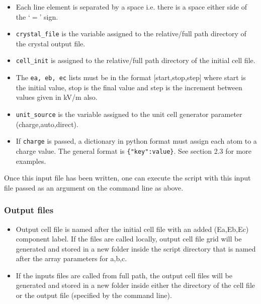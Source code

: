\begin{itemize}
	\item Each line element is separated by a space i.e. there is a space either side of the `$=$' sign.
	
	\item \texttt{crystal\_file} is the variable assigned to the relative/full path directory of the crystal output file.
	
	\item \texttt{cell\_init} is assigned to the relative/full path directory of the initial cell file.
	
	\item The \texttt{ea, eb, ec} lists must be in the format [start,stop,step] where start is the initial value, stop is the final value and step is the increment between values given in kV/m also.
	
	\item \texttt{unit\_source} is the variable assigned to the unit cell generator parameter (charge,auto,direct).
	
	\item If \texttt{charge} is passed, a dictionary in python format must assign each atom to a charge value. The general format is \texttt{\{"key":value\}}. See section 2.3 for more examples.
	
\end{itemize}

Once this input file has been written, one can execute the script with this input file passed as an argument on the command line as above. 

\subsubsection{Output files}

\begin{itemize}
	\item Output cell file is named after the initial cell file with an added (Ea,Eb,Ec) component label. If the files are called locally, output cell file grid will be generated and stored in a new folder inside the script directory that is named after the array parameters for a,b,c.
	\item If the inputs files are called from full path, the output cell files will be generated and stored in a new folder inside either the directory of the cell file or the output file (specified by the command line).
\end{itemize}





